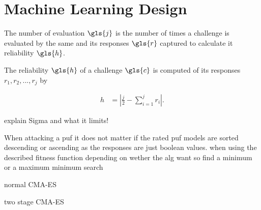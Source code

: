 \section{Machine Learning Design}
\label{sec:machinelearningdesign}

The number of evaluation $\gls{j}$ is the number of times a challenge is evaluated by the same \apuf and its responses $\gls{r}$ captured to calculate it reliability $\gls{h}$.

The reliability $\gls{h}$ of a challenge $\gls{c}$ is computed of its responses $r_1, r_2, ..., r_j$ by

\begin{align}
h &= |\frac{j}{2} - \sum_{i = 1}^{j}r_i|. \label{equ:reliability}
\end{align}




explain Sigma and what it limits!

When attacking a puf it does not matter if the rated puf models are sorted descending or ascending as the responses are just boolean values.
when using the described fitness function
depending on wether the alg want so find a minimum or a maximum
minimum search


normal CMA-ES

two stage CMA-ES

